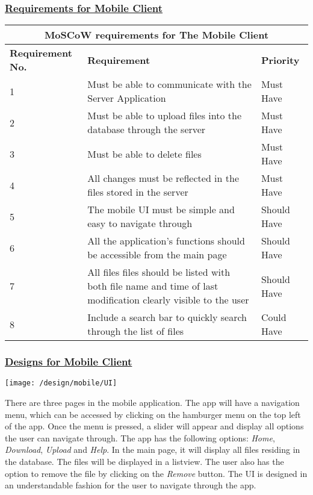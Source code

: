 \documentclass{article}
\begin{document}
\subsubsection{\underline{Requirements for Mobile Client}}
\begin{tabular}{|p{3cm}|p{5cm}|p{4cm}|}
\hline
\multicolumn{3}{|c|}{\textbf{MoSCoW requirements for The Mobile Client}} \\
\hline
\textbf{Requirement No.} & \textbf{Requirement} & \textbf{Priority}\\
\hline
1 & Must be able to communicate with the Server Application & Must Have \\
\hline
2 & Must be able to upload files into the database through the server & Must Have \\
\hline
3 & Must be able to delete files & Must Have \\
\hline
4 & All changes must be reflected in the files stored in the server & Must Have \\
\hline
5 & The mobile UI must be simple and easy to navigate through & Should Have \\
\hline
6 & All the application's functions should be accessible from the main page & Should Have \\
\hline
7 & All files files should be listed with both file name and time of last modification clearly visible to the user & Should Have \\
\hline
8 & Include a search bar to quickly search through the list of files & Could Have \\
\hline
\end{tabular}

\subsubsection{\underline{Designs for Mobile Client}}

\texttt{[image: /design/mobile/UI]}

There are three pages in the mobile application. The app will have a navigation menu, which can be accessed by clicking on the hamburger menu on the top left of the app. Once the menu is pressed, a slider will appear and display all options the user can navigate through. The app has the following options: \textit{Home}, \textit{Download}, \textit{Upload} and \textit{Help}. In the main page, it will display all files residing in the database. The files will be displayed in a listview. The user also has the option to remove the file by clicking on the \textit{Remove} button. The UI is designed in an understandable fashion for the user to navigate through the app.
\end{document}
